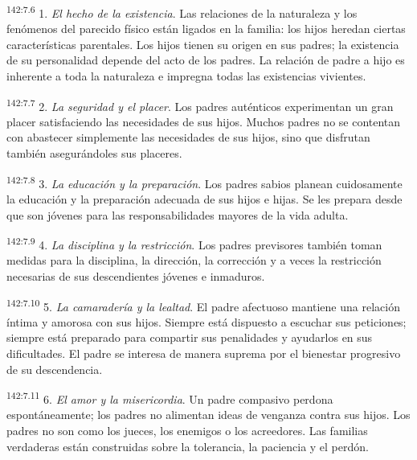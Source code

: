 \par 
\textsuperscript{142:7.6} 1. \textit{El hecho de la existencia}. Las relaciones de la naturaleza y los fenómenos del parecido físico están ligados en la familia: los hijos heredan ciertas características parentales. Los hijos tienen su origen en sus padres; la existencia de su personalidad depende del acto de los padres. La relación de padre a hijo es inherente a toda la naturaleza e impregna todas las existencias vivientes.

\par 
\textsuperscript{142:7.7} 2. \textit{La seguridad y el placer}. Los padres auténticos experimentan un gran placer satisfaciendo las necesidades de sus hijos. Muchos padres no se contentan con abastecer simplemente las necesidades de sus hijos, sino que disfrutan también asegurándoles sus placeres.

\par 
\textsuperscript{142:7.8} 3. \textit{La educación y la preparación}. Los padres sabios planean cuidosamente la educación y la preparación adecuada de sus hijos e hijas. Se les prepara desde que son jóvenes para las responsabilidades mayores de la vida adulta.

\par 
\textsuperscript{142:7.9} 4. \textit{La disciplina y la restricción}. Los padres previsores también toman medidas para la disciplina, la dirección, la corrección y a veces la restricción necesarias de sus descendientes jóvenes e inmaduros.

\par 
\textsuperscript{142:7.10} 5. \textit{La camaradería y la lealtad}. El padre afectuoso mantiene una relación íntima y amorosa con sus hijos. Siempre está dispuesto a escuchar sus peticiones; siempre está preparado para compartir sus penalidades y ayudarlos en sus dificultades. El padre se interesa de manera suprema por el bienestar progresivo de su descendencia.

\par 
\textsuperscript{142:7.11} 6. \textit{El amor y la misericordia}. Un padre compasivo perdona espontáneamente; los padres no alimentan ideas de venganza contra sus hijos. Los padres no son como los jueces, los enemigos o los acreedores. Las familias verdaderas están construidas sobre la tolerancia, la paciencia y el perdón.

